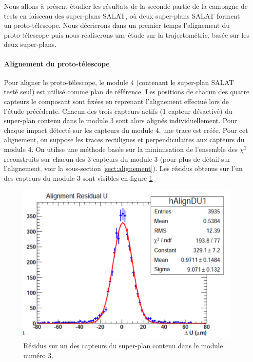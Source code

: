   Nous allons \`a pr\'esent \'etudier les r\'esultats de la seconde partie de la campagne de tests en faisceau des super-plans SALAT, o\`u deux super-plans SALAT forment un proto-t\'elescope. Nous d\'ecrierons dans un premier temps l'alignement du proto-t\'elescope puis nous r\'ealiserons une \'etude sur la trajectom\'etrie, bas\'ee sur les deux super-plans.
  
  \paragraph{Alignement du proto-t\'elescope}
  
  Pour aligner le proto-t\'elescope, le module 4 (contenant le super-plan SALAT test\'e seul) est utilis\'e comme plan de r\'ef\'erence. Les positions de chacun des quatre capteurs le composant sont fix\'ees en reprenant l'alignement effectu\'e lors de l'\'etude pr\'ec\'edente. Chacun des trois capteurs actifs (1 capteur d\'esactiv\'e) du super-plan contenu dans le module 3 sont alors align\'es individuellement. Pour chaque impact d\'etect\'e sur les capteurs du module 4, une trace est cr\'e\'ee. Pour cet alignement, on suppose les traces rectilignes et perpendiculaires aux capteurs du module 4. On utilise une m\'ethode bas\'ee sur la minimisation de l'ensemble des $\chi^2$ reconstruits sur chacun des 3 capteurs  du module 3 (pour plus de d\'etail sur l'alignement, voir la sous-section \ref{sect:alignement}). Les r\'esidus obtenus sur l'un des capteurs du module 3 sont visibles en figure \ref{fig:Align_proto_tel}
  
   \begin{figure}[!htb]
    \begin{center} 
      \includegraphics[scale=0.50]{./figures/SALAT_beam_test/residus_super-plan-3_proto_tel.png}
      \caption{R\'esidus sur un des capteurs du super-plan contenu dans le module num\'ero 3.}
      \label{fig:Align_proto_tel}
    \end{center}
   \end{figure}
  
